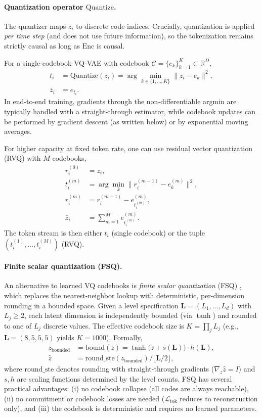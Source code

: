 \documentclass[11pt]{article}
\begin{document}
\paragraph{Quantization operator $\mathrm{Quantize}$.}
The quantizer maps $z_i$ to discrete code indices. Crucially, quantization is applied \emph{per time step} (and does not use future information), so the tokenization remains strictly causal as long as $\mathrm{Enc}$ is causal.

For a single-codebook VQ-VAE with codebook $\mathcal{C}=\{e_k\}_{k=1}^{K}\subset\mathbb{R}^{D}$,
\begin{align}
  t_i &= \mathrm{Quantize}(z_i) = \arg\min_{k\in\{1,\dots,K\}} \lVert z_i - e_k\rVert^2,\\
  \bar z_i &= e_{t_i}.
\end{align}
In end-to-end training, gradients through the non-differentiable argmin are typically handled with a straight-through estimator, while codebook updates can be performed by gradient descent (as written below) or by exponential moving averages.

For higher capacity at fixed token rate, one can use residual vector quantization (RVQ) with $M$ codebooks,
\begin{align}
  r_i^{(0)} &= z_i, \\
  t_i^{(m)} &= \arg\min_k \lVert r_i^{(m-1)} - e_k^{(m)}\rVert^2, \\
  r_i^{(m)} &= r_i^{(m-1)} - e_{t_i^{(m)}}^{(m)}, \\
  \bar z_i &= \sum_{m=1}^{M} e_{t_i^{(m)}}^{(m)}.
\end{align}
The token stream is then either $t_i$ (single codebook) or the tuple $(t_i^{(1)},\dots,t_i^{(M)})$ (RVQ).

\paragraph{Finite scalar quantization (FSQ).}
An alternative to learned VQ codebooks is \emph{finite scalar quantization} (FSQ) \cite{mentzer2024fsq}, which replaces the nearest-neighbor lookup with deterministic, per-dimension rounding in a bounded space. Given a level specification $\bm{L}=(L_1,\dots,L_d)$ with $L_j\ge 2$, each latent dimension is independently bounded (via $\tanh$) and rounded to one of $L_j$ discrete values. The effective codebook size is $K=\prod_j L_j$ (e.g., $\bm{L}=(8,5,5,5)$ yields $K=1000$). Formally,
\begin{align}
  z_{\mathrm{bounded}} &= \mathrm{bound}(z) = \tanh\bigl(z + s(\bm{L})\bigr) \cdot h(\bm{L}), \\
  \hat z &= \mathrm{round\_ste}(z_{\mathrm{bounded}}) / \lfloor \bm{L}/2 \rfloor,
\end{align}
where $\mathrm{round\_ste}$ denotes rounding with straight-through gradients ($\nabla_z \hat z = I$) and $s,h$ are scaling functions determined by the level counts. FSQ has several practical advantages: (i) no codebook collapse (all codes are always reachable), (ii) no commitment or codebook losses are needed ($\mathcal{L}_{\mathrm{tok}}$ reduces to reconstruction only), and (iii) the codebook is deterministic and requires no learned parameters.
\end{document}
